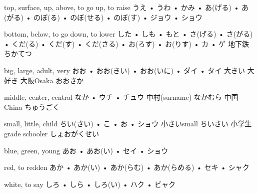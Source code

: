 



\setcounter{cardnum}{57}

		{top, surface, up, above, to go up, to raise}
		{うえ • うわ • かみ • あ(げる) • あ(がる) • のぼ(る) • のぼ(せる) • のぼ(す) • ジョウ • ショウ}
		{}{}
		{}{}
		{}{}
		{}{}
		{}{}

		{bottom, below, to go down, to lower}
		{した • しも • もと • さ(げる) • さ(がる) • くだ(る) • くだ(す) • くだ(さる) • お(ろす) • お(りす) • カ • ゲ}
		{地下鉄 }{ちかてつ}
		{}{}
		{}{}
		{}{}
		{}{}

		{big, large, adult, very}
		{おお • おお(きい) • おお(いに) • ダイ • タイ}
		{大きい}{}
		{大好き}{}
		{大阪}{Osaka おおさか}
		{}{}
		{}{}

		{middle, center, central}
		{なか • ウチ • チュウ}
		{中村}{(surname) なかむら}
		{中国}{China ちゅうごく}
		{}{}
		{}{}
		{}{}

		{small, little, child}
		{ちい(さい) • こ • お • ショウ}
		{小さい}{small ちいさい}
		{小学生}{grade schooler しょおがくせい}
		{}{}
		{}{}
		{}{}

		{blue, green, young}
		{あお • あお(い) • セイ • ショウ}
		{}{}
		{}{}
		{}{}
		{}{}
		{}{}

		{red, to redden}
		{あか • あか(い) • あか(らむ) • あか(らめる) • セキ • シャク}
		{}{}
		{}{}
		{}{}
		{}{}
		{}{}

		{white, to say}
		{しろ • しら • しろ(い) • ハク • ビャク}
		{}{}
		{}{}
		{}{}
		{}{}
		{}{}

